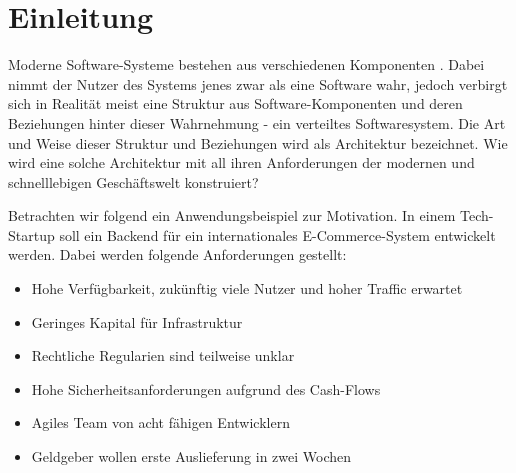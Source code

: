 \documentclass[acmtog]{acmart}
\begin{document}
\maketitle

\section{Einleitung}
\label{sec:intro}
Moderne Software-Systeme bestehen aus verschiedenen Komponenten \cite{evolutionOfDistributedSystems}.
Dabei nimmt der Nutzer des Systems jenes zwar als eine Software wahr, jedoch verbirgt sich in Realität meist eine Struktur aus
Software-Komponenten und deren Beziehungen hinter dieser Wahrnehmung - ein verteiltes Softwaresystem.
Die Art und Weise dieser Struktur und Beziehungen wird als Architektur bezeichnet.
Wie wird eine solche Architektur mit all ihren Anforderungen der modernen und schnelllebigen Geschäftswelt konstruiert?

Betrachten wir folgend ein Anwendungsbeispiel zur Motivation.
In einem Tech-Startup soll ein Backend für ein internationales E-Commerce-System entwickelt werden.
Dabei werden folgende Anforderungen gestellt:
\begin{itemize}
  \item Hohe Verfügbarkeit, zukünftig viele Nutzer und hoher Traffic erwartet
  \item Geringes Kapital für Infrastruktur
  \item Rechtliche Regularien sind teilweise unklar
  \item Hohe Sicherheitsanforderungen aufgrund des Cash-Flows
  \item Agiles Team von acht fähigen Entwicklern
  \item Geldgeber wollen erste Auslieferung in zwei Wochen
\end{itemize}
\end{document}
